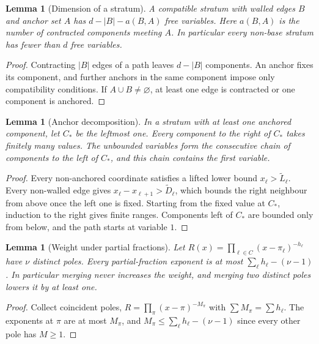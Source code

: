 \documentclass[11pt]{amsart}
\newtheorem{lemma}[theorem]{Lemma}
\theoremstyle{definition}
\theoremstyle{remark}
\numberwithin{equation}{section}
\begin{document}
\begin{lemma}[Dimension of a stratum]\label{lem:dim}
A compatible stratum with walled edges $B$ and anchor set $A$ has $d-|B|-a(B,A)$ free variables. Here $a(B,A)$ is the number of contracted components meeting $A$. In particular every non-base stratum has fewer than $d$ free variables.
\end{lemma}
\begin{proof}
Contracting $|B|$ edges of a path leaves $d-|B|$ components. An anchor fixes its component, and further anchors in the same component impose only compatibility conditions. If $A\cup B\ne\varnothing$, at least one edge is contracted or one component is anchored.
\end{proof}

\begin{lemma}[Anchor decomposition]\label{lem:anchor}
In a stratum with at least one anchored component, let $C_*$ be the leftmost one. Every component to the right of $C_*$ takes finitely many values. The unbounded variables form the consecutive chain of components to the left of $C_*$, and this chain contains the first variable.
\end{lemma}
\begin{proof}
Every non-anchored coordinate satisfies a lifted lower bound $x_\ell>\tilde L_\ell$. Every non-walled edge gives $x_\ell-x_{\ell+1}>\tilde D_\ell$, which bounds the right neighbour from above once the left one is fixed. Starting from the fixed value at $C_*$, induction to the right gives finite ranges. Components left of $C_*$ are bounded only from below, and the path starts at variable $1$.
\end{proof}

\begin{lemma}[Weight under partial fractions]\label{lem:weight}
Let $R(x)=\prod_{\ell\in C}(x-\pi_\ell)^{-h_\ell}$ have $\nu$ distinct poles. Every partial-fraction exponent is at most $\sum_\ell h_\ell-(\nu-1)$. In particular merging never increases the weight, and merging two distinct poles lowers it by at least one.
\end{lemma}
\begin{proof}
Collect coincident poles, $R=\prod_{\pi}(x-\pi)^{-M_\pi}$ with $\sum M_\pi=\sum h_\ell$. The exponents at $\pi$ are at most $M_\pi$, and $M_\pi\le\sum_\ell h_\ell-(\nu-1)$ since every other pole has $M\ge1$.
\end{proof}
\end{document}
